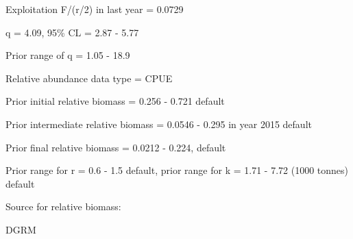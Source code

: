 \documentclass[12pt,a4paper]{article}\usepackage[]{graphicx}\usepackage[]{xcolor}
\begin{document}
Exploitation F/(r/2) in last year = 0.0729

q = 4.09, 95\% CL = 2.87 - 5.77

Prior range of q = 1.05 - 18.9

Relative abundance data type = CPUE

Prior initial relative biomass = 0.256 - 0.721 default

Prior intermediate relative biomass = 0.0546 - 0.295 in year 2015 default

Prior final relative biomass = 0.0212 - 0.224, default

Prior range for r = 0.6 - 1.5 default, prior range for k = 1.71 - 7.72 (1000 tonnes) default

Source for relative biomass: 

DGRM

    
\end{document}
